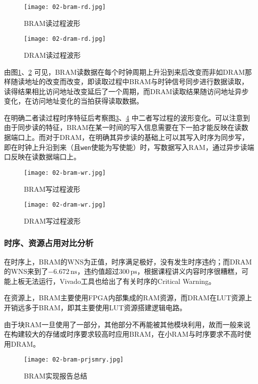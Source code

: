 \documentclass[UTF-8,twoside,c5size]{ctexart}
\begin{document}
	\begin{figure}[!h]
		\centering
		\texttt{[image: 02-bram-rd.jpg]}
		\caption{BRAM读过程波形}
		\label{bram-rd}
	\end{figure}

	\begin{figure}[!h]
		\centering
		\texttt{[image: 02-dram-rd.jpg]}
		\caption{DRAM读过程波形}
		\label{dram-rd}
	\end{figure}

	由图\ref{bram-rd}、\ref{dram-rd} 可见，BRAM读数据在每个时钟周期上升沿到来后改变而非如DRAM那样随读地址的改变而改变，即读取过程中BRAM与时钟信号同步进行数据读取，读得结果相比访问地址改变延后了一个周期，而DRAM读取结果随访问地址异步变化，在访问地址变化的当拍获得读取数据。
	
	在明确二者读过程时序特征后考察图\ref{bram-wr}、\ref{dram-wr} 中二者写过程的波形变化。可以注意到由于同步读的特征，BRAM在某一时间的写入信息需要在下一拍才能反映在读数据端口上。而对于DRAM，在明确其异步读的基础上可以其写入时序为同步写，即在时钟上升沿到来（且\texttt{wen}使能为写使能）时，写数据写入RAM，通过异步读端口反映在读数据端口上。
	
	\begin{figure}[!h]
		\centering
		\texttt{[image: 02-bram-wr.jpg]}
		\caption{BRAM写过程波形}
		\label{bram-wr}
	\end{figure}

	\begin{figure}[!h]
		\centering
		\texttt{[image: 02-dram-wr.jpg]}
		\caption{DRAM写过程波形}
		\label{dram-wr}
	\end{figure}

	\subsubsection{时序、资源占用对比分析}
	
	在时序上，BRAM的WNS为正值，时序满足极好，没有发生时序违约；而DRAM的WNS来到了$ -6.672\,\text{ns} $，违约值超过$ 300\,\text{ps} $，根据课程讲义内容时序很糟糕，可能上板无法运行，Vivado工具也给出了有关时序的Critical Warning。
	
	在资源上，BRAM主要使用FPGA内部集成的RAM资源，而DRAM在LUT资源上开销远多于BRAM，即其主要使用LUT资源搭建逻辑电路。
	
	由于块RAM一旦使用了一部分，其他部分不再能被其他模块利用，故而一般来说在构建较大的存储或时序要求较高时应用BRAM，在小RAM与时序要求不高时使用DRAM。
	
	\begin{figure}[!h]
		\centering
		\texttt{[image: 02-bram-prjsmry.jpg]}
		\caption{BRAM实现报告总结}
		\label{bram-prjsmry}
	\end{figure}
\end{document}
